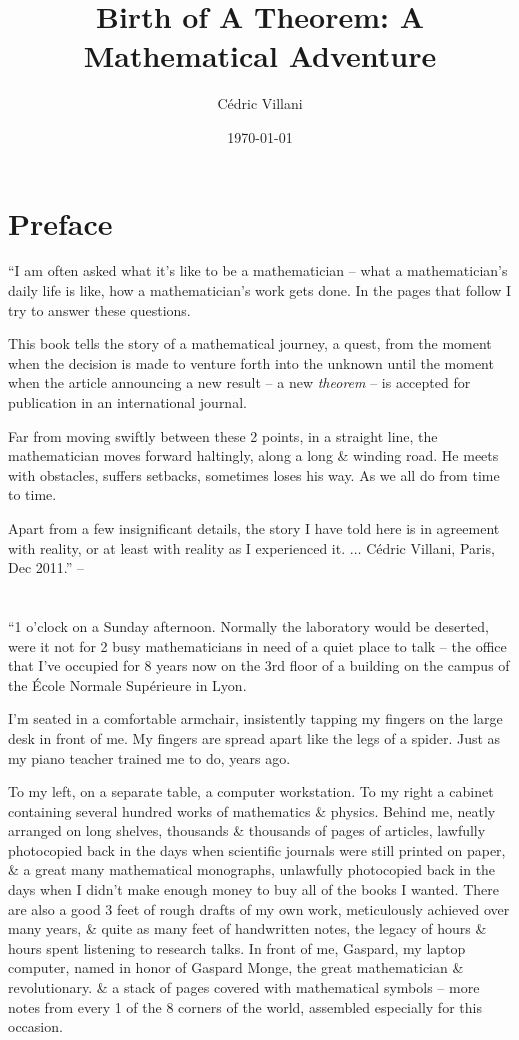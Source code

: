 \documentclass{article}
\title{Birth of A Theorem: A Mathematical Adventure}
\author{C\'edric Villani}
\date{\today}
\numberwithin{equation}{section}
\begin{document}
\maketitle
\tableofcontents


\section*{Preface}
``I am often asked what it's like to be a mathematician -- what a mathematician's daily life is like, how a mathematician's work gets done. In the pages that follow I try to answer these questions.

This book tells the story of a mathematical journey, a quest, from the moment when the decision is made to venture forth into the unknown until the moment when the article announcing a new result -- a new \textit{theorem} -- is accepted for publication in an international journal.

Far from moving swiftly between these 2 points, in a straight line, the mathematician moves forward haltingly, along a long \& winding road. He meets with obstacles, suffers setbacks, sometimes loses his way. As we all do from time to time. 

Apart from a few insignificant details, the story I have told here is in agreement with reality, or at least with reality as I experienced it. $\ldots$ C\'edric Villani, Paris, Dec 2011.'' -- \cite[p. 5]{Villani2015}

\section{}
``1 o'clock on a Sunday afternoon. Normally the laboratory would be deserted, were it not for 2 busy mathematicians in need of a quiet place to talk -- the office that I've occupied for  8 years now on the 3rd floor of a building on the campus of the \'Ecole Normale Sup\'erieure in Lyon.

I'm seated in a comfortable armchair, insistently tapping my fingers on the large desk in front of me. My fingers are spread apart like the legs of a spider. Just as my piano teacher trained me to do, years ago.

To my left, on a separate table, a computer workstation. To my right a cabinet containing several hundred works of mathematics \& physics. Behind me, neatly arranged on long shelves, thousands \& thousands of pages of articles, lawfully photocopied back in the days when scientific journals were  still printed on paper, \& a great many mathematical monographs, unlawfully photocopied back in the days when I didn't make enough money to buy all of the books I wanted. There are also a good 3 feet of rough drafts of my own work, meticulously achieved over many years, \& quite as many feet of handwritten notes, the legacy of hours \& hours spent listening to research talks. In front of me, Gaspard, my laptop computer, named in honor of Gaspard Monge, the great mathematician \& revolutionary. \& a stack of pages covered with mathematical symbols -- more notes from every 1 of the 8 corners of the world, assembled especially for this occasion.
\end{document}

